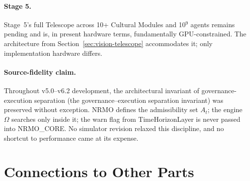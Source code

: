 \paragraph{Stage 5.}
Stage~5's full Telescope across 10+ Cultural Modules and 10$^9$
agents remains pending and is, in present hardware terms,
fundamentally GPU-constrained. The architecture from
Section~\ref{sec:vision-telescope} accommodates it; only
implementation hardware differs.

\paragraph{Source-fidelity claim.}
Throughout v5.0--v6.2 development, the architectural invariant of
governance-execution separation
(the governance--execution separation invariant) was preserved without
exception. NRMO defines the admissibility set $A_t$; the engine
$\Omega$ searches only inside it; the warn flag from
TimeHorizonLayer is never passed into NRMO\_CORE\@. No simulator
revision relaxed this discipline, and no shortcut to performance
came at its expense.

\section{Connections to Other Parts}

